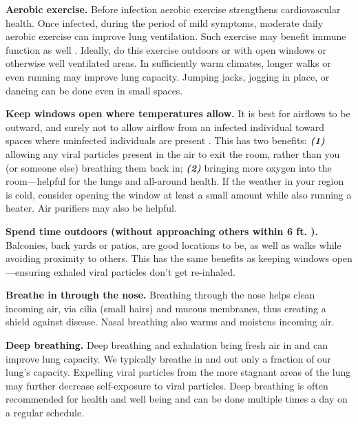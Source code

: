 \documentclass[onecolumn,journal]{IEEEtran}
\begin{document}
\begin{multicols}{2}
\textbf{Aerobic exercise.} Before infection aerobic exercise strengthens cardiovascular health. Once infected, during the period of mild symptoms, moderate daily aerobic exercise can improve lung ventilation. Such exercise may benefit immune function as well \cite{medline}. Ideally, do this exercise outdoors or with open windows or otherwise well ventilated areas. In sufficiently warm climates, longer walks or even running may improve lung capacity. Jumping jacks, jogging in place, or dancing can be done even in small spaces. %

\textbf{Keep windows open where temperatures allow.} It is best for airflows to be outward, and surely not to allow airflow from an infected individual toward spaces where uninfected individuals are present \cite{stcn}. This has two benefits: \textbf{\textit{(1)}} allowing any viral particles present in the air to exit the room, rather than you (or someone else) breathing them back in; \textit{\textbf{(2)}} bringing more oxygen into the room---helpful for the lungs and all-around health. If the weather in your region is cold, consider opening the window at least a small amount while also running a heater. Air purifiers may also be helpful. 

\textbf{Spend time outdoors (without approaching others within 6 ft. \cite{cdc_distancing}).}  Balconies, back yards or patios, are good locations to be, as well as walks while avoiding proximity to others. This has the same benefits as keeping windows open---ensuring exhaled viral particles don't get re-inhaled.

\textbf{Breathe in through the nose.} Breathing through the nose helps clean incoming air, via cilia (small hairs) and mucous membranes, thus creating a shield against disease. Nasal breathing also warms and moistens incoming air.

\textbf{Deep breathing.} Deep breathing and exhalation bring fresh air in and can improve lung capacity. We typically breathe in and out only a fraction of our lung's capacity. Expelling viral particles from the more stagnant areas of the lung may further decrease self-exposure to viral particles. Deep breathing is often recommended for health and well being and can be done multiple times a day on a regular schedule.   


\end{multicols}
\end{document}
